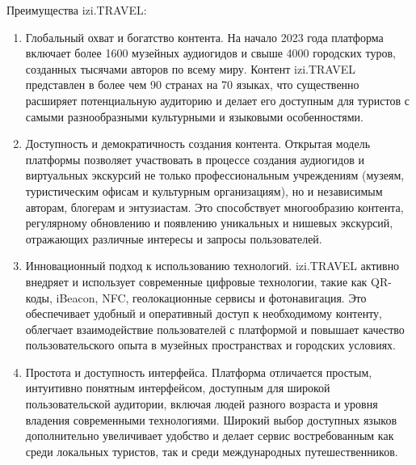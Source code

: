 Преимущества izi.TRAVEL:
\begin{enumerate}
    \item Глобальный охват и богатство контента. На начало 2023 года платформа включает более 1600 музейных аудиогидов и свыше 4000 городских туров, созданных тысячами авторов по всему миру. Контент izi.TRAVEL представлен в более чем 90 странах на 70 языках, что существенно расширяет потенциальную аудиторию и делает его доступным для туристов с самыми разнообразными культурными и языковыми особенностями.
    \item Доступность и демократичность создания контента. Открытая модель платформы позволяет участвовать в процессе создания аудиогидов и виртуальных экскурсий не только профессиональным учреждениям (музеям, туристическим офисам и культурным организациям), но и независимым авторам, блогерам и энтузиастам. Это способствует многообразию контента, регулярному обновлению и появлению уникальных и нишевых экскурсий, отражающих различные интересы и запросы пользователей.
    \item Инновационный подход к использованию технологий. izi.TRAVEL активно внедряет и использует современные цифровые технологии, такие как QR-коды, iBeacon, NFC, геолокационные сервисы и фотонавигация. Это обеспечивает удобный и оперативный доступ к необходимому контенту, облегчает взаимодействие пользователей с платформой и повышает качество пользовательского опыта в музейных пространствах и городских условиях.
    \item Простота и доступность интерфейса. Платформа отличается простым, интуитивно понятным интерфейсом, доступным для широкой пользовательской аудитории, включая людей разного возраста и уровня владения современными технологиями. Широкий выбор доступных языков дополнительно увеличивает удобство и делает сервис востребованным как среди локальных туристов, так и среди международных путешественников.
\end{enumerate}

